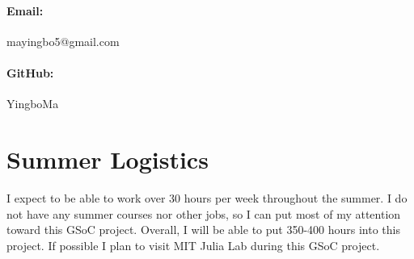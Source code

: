\documentclass[12pt]{article}
\begin{document}
\paragraph{Email:} mayingbo5@gmail.com
\paragraph{GitHub:} YingboMa

\section{Summer Logistics}
I expect to be able to work over 30 hours per week throughout the summer. I do
not have any summer courses nor other jobs, so I can put most of my attention
toward this GSoC project. Overall, I will be able to put 350-400 hours into
this project. If possible I plan to visit MIT Julia Lab during this GSoC
project.


\end{document}
